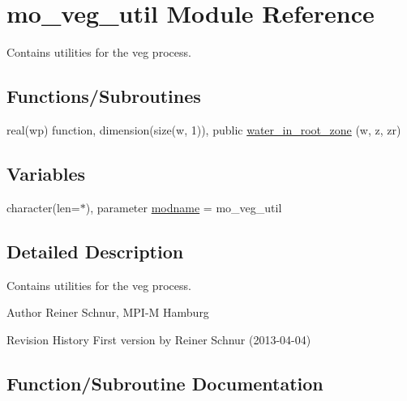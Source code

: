 \hypertarget{namespacemo__veg__util}{}\section{mo\+\_\+veg\+\_\+util Module Reference}
\label{namespacemo__veg__util}


Contains utilities for the veg process.  


\subsection*{Functions/\+Subroutines}
\begin{DoxyCompactItemize}
\item 
real(wp) function, dimension(size(w, 1)), public \hyperlink{namespacemo__veg__util_af6216ea4cafe0107cd77fd3774c1b948}{water\+\_\+in\+\_\+root\+\_\+zone} (w, z, zr)
\end{DoxyCompactItemize}
\subsection*{Variables}
\begin{DoxyCompactItemize}
\item 
character(len=$\ast$), parameter \hyperlink{namespacemo__veg__util_a7c115cfdb9def27cc2cb0f8a8332485f}{modname} = \textquotesingle{}mo\+\_\+veg\+\_\+util\textquotesingle{}
\end{DoxyCompactItemize}


\subsection{Detailed Description}
Contains utilities for the veg process. 

\begin{DoxyAuthor}{Author}
Reiner Schnur, M\+P\+I-\/\+M Hamburg
\end{DoxyAuthor}
\begin{DoxyParagraph}{Revision History}
First version by Reiner Schnur (2013-\/04-\/04) 
\end{DoxyParagraph}


\subsection{Function/\+Subroutine Documentation}
\hypertarget{namespacemo__veg__util_af6216ea4cafe0107cd77fd3774c1b948}{}
